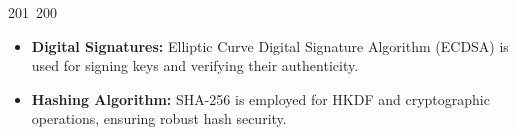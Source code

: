 201~200~\documentclass{article}
\begin{document}
\begin{itemize}
	                                                                                                                                                                                                                                                                                                	                                                                                                                                        	    	                                                                                                	                                                                                                                                                                                                                                                                                                                                	                                                                        	                                                                        	                                                                                                                                        	                                                                                                                                                                \item \textbf{Digital Signatures:} Elliptic Curve Digital Signature Algorithm (ECDSA) is used for signing keys and verifying their authenticity.
	                                                                                                                                                                                                                                                                                                	                                                                                                                                        	    	                                                                                                	                                                                                                                                                                                                                                                                                                                                	                                                                        	                                                                        	                                                                                                                                        	                                                                                                                                                                    \item \textbf{Hashing Algorithm:} SHA-256 is employed for HKDF and cryptographic operations, ensuring robust hash security.

\end{itemize}
\end{document}
